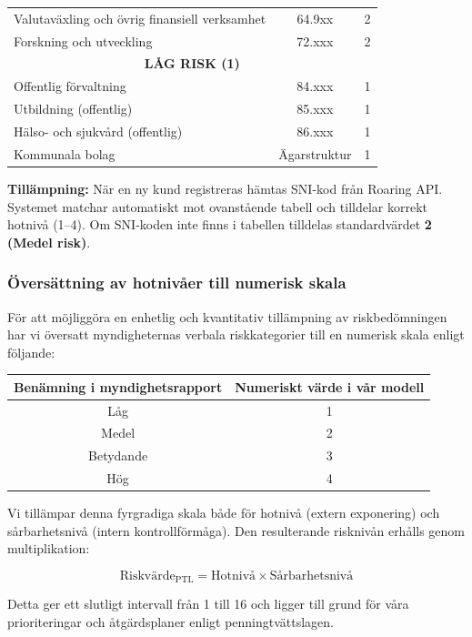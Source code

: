 \documentclass{article}
\begin{document}
\begin{center}
\begin{tabular}{|p{7cm}|c|c|}
Valutaväxling och övrig finansiell verksamhet & 64.9xx & 2 \\
Forskning och utveckling & 72.xxx & 2 \\
\hline
\multicolumn{3}{|c|}{\textbf{LÅG RISK (1)}} \\
\hline
Offentlig förvaltning & 84.xxx & 1 \\
Utbildning (offentlig) & 85.xxx & 1 \\
Hälso- och sjukvård (offentlig) & 86.xxx & 1 \\
Kommunala bolag & Ägarstruktur & 1 \\
\hline
\end{tabular}
\end{center}

\textbf{Tillämpning:} När en ny kund registreras hämtas SNI-kod från Roaring API. Systemet matchar automatiskt mot ovanstående tabell och tilldelar korrekt hotnivå (1--4). Om SNI-koden inte finns i tabellen tilldelas standardvärdet \textbf{2 (Medel risk)}.

\subsubsection*{Översättning av hotnivåer till numerisk skala}

För att möjliggöra en enhetlig och kvantitativ tillämpning av riskbedömningen har vi översatt myndigheternas verbala riskkategorier till en numerisk skala enligt följande:

\begin{center}
\begin{tabular}{|c|c|}
\hline
\textbf{Benämning i myndighetsrapport} & \textbf{Numeriskt värde i vår modell} \\
\hline
Låg & 1 \\
Medel & 2 \\
Betydande & 3 \\
Hög & 4 \\
\hline
\end{tabular}
\end{center}

Vi tillämpar denna fyrgradiga skala både för hotnivå (extern exponering) och sårbarhetsnivå (intern kontrollförmåga). Den resulterande risknivån erhålls genom multiplikation:

\[
\text{Riskvärde}_{\text{PTL}} = \text{Hotnivå} \times \text{Sårbarhetsnivå}
\]

Detta ger ett slutligt intervall från 1 till 16 och ligger till grund för våra prioriteringar och åtgärdsplaner enligt penningtvättslagen.
\end{document}
